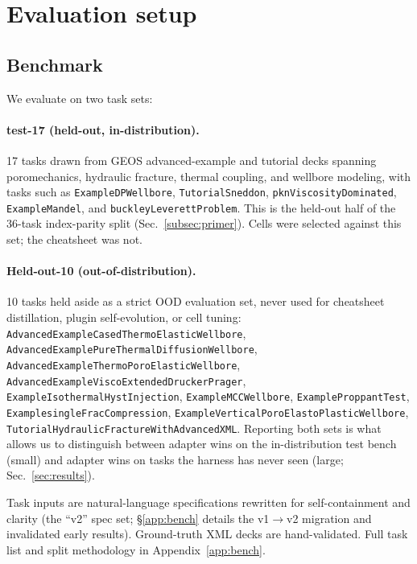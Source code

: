\documentclass{article}
\begin{document}
\section{Evaluation setup}
\label{sec:eval}

\subsection{Benchmark}
\label{subsec:bench-summary}

We evaluate on two task sets:

\paragraph{test-17 (held-out, in-distribution).} 17 tasks drawn from GEOS advanced-example and tutorial decks spanning poromechanics, hydraulic fracture, thermal coupling, and wellbore modeling, with tasks such as \texttt{ExampleDPWellbore}, \texttt{TutorialSneddon}, \texttt{pknViscosityDominated}, \texttt{ExampleMandel}, and \texttt{buckleyLeverettProblem}. This is the held-out half of the 36-task index-parity split (Sec.~\ref{subsec:primer}). Cells were selected against this set; the cheatsheet was not.

\paragraph{Held-out-10 (out-of-distribution).}\label{subsec:held-out-set} 10 tasks held aside as a strict OOD evaluation set, never used for cheatsheet distillation, plugin self-evolution, or cell tuning: \texttt{AdvancedExampleCasedThermoElasticWellbore}, \texttt{AdvancedExamplePureThermalDiffusionWellbore}, \texttt{AdvancedExampleThermoPoroElasticWellbore}, \texttt{AdvancedExampleViscoExtendedDruckerPrager}, \texttt{ExampleIsothermalHystInjection}, \texttt{ExampleMCCWellbore}, \texttt{ExampleProppantTest}, \texttt{ExamplesingleFracCompression}, \texttt{ExampleVerticalPoroElastoPlasticWellbore}, \texttt{TutorialHydraulicFractureWithAdvancedXML}. Reporting both sets is what allows us to distinguish between adapter wins on the in-distribution test bench (small) and adapter wins on tasks the harness has never seen (large; Sec.~\ref{sec:results}).

Task inputs are natural-language specifications rewritten for self-containment and clarity (the ``v2'' spec set; \S\ref{app:bench} details the v1$\rightarrow$v2 migration and invalidated early results). Ground-truth XML decks are hand-validated. Full task list and split methodology in Appendix~\ref{app:bench}.
\end{document}
